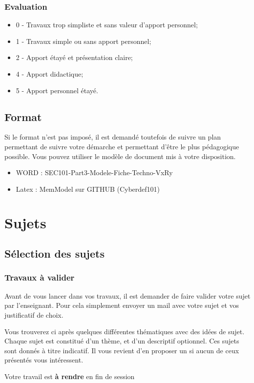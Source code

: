 \begin{frame}
\frametitle<presentation>{Evaluation}

\begin{itemize}
  \item 0 - Travaux trop simpliste et sans valeur d'apport personnel;
  \item 1 - Travaux simple ou sans apport personnel;
  \item 2 - Apport étayé et présentation claire;
  \item 4 - Apport didactique;
  \item 5 - Apport personnel étayé.
\end{itemize}
\end{frame}

\subsection{Format}

Si le format n'est pas imposé, il est demandé toutefois de suivre un plan permettant de suivre votre démarche et permettant d'être le plus pédagogique possible.
Vous pouvez utiliser le modèle de document mis à votre disposition.

\begin{itemize}
  \item WORD : SEC101-Part3-Modele-Fiche-Techno-VxRy
  \item Latex :  MemModel sur GITHUB (Cyberdef101)
\end{itemize}

\section{Sujets}

\subsection{Sélection des sujets}

\begin{frame}
\frametitle<presentation>{Travaux à valider}
Avant de vous lancer dans vos travaux, il est demander de faire valider votre sujet par l'enseignant. Pour cela simplement envoyer un mail avec votre sujet et vos justificatif de choix.

Vous trouverez ci après quelques différentes thématiques avec des idées de sujet. Chaque sujet est constitué d'un thème, et d'un descriptif optionnel.
Ces sujets sont donnés à titre indicatif. Il vous revient d'en proposer un si aucun de ceux présentés vous intéressent.

Votre travail est \textbf{à rendre} en fin de session

\end{frame}

